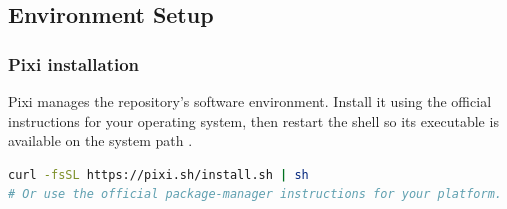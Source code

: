 \documentclass[11pt]{article}
\newcommand{\code}[1]{\texttt{\detokenize{#1}}}
\begin{document}


\subsection{Environment Setup}
\subsubsection{Pixi installation}
Pixi manages the repository's software environment. Install it using the official instructions for your operating system, then restart the shell so its executable is available on the system path \cite{pixiinstall}.
\begin{lstlisting}[language=bash]
curl -fsSL https://pixi.sh/install.sh | sh
# Or use the official package-manager instructions for your platform.
\end{lstlisting}
\end{document}
